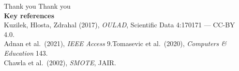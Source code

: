 \documentclass[aspectratio=169,10pt]{beamer}
\begin{document}
\begin{frame}[plain]{Thank you}
  \vfill\centering
  {\Huge\textcolor{ccnured}{Thank you}}\\[1.0em]
  {\footnotesize\textbf{Key references}}\\[0.3em]
  {\scriptsize
   Kuzilek, Hlosta, Zdrahal (2017), \emph{OULAD}, Scientific Data 4:170171 — CC-BY 4.0.\\
   Adnan et al.\ (2021), \emph{IEEE Access} 9.\quad Tomasevic et al.\ (2020), \emph{Computers \& Education} 143.\\
   Chawla et al.\ (2002), \emph{SMOTE}, JAIR.}
  \vfill
\end{frame}
\end{document}
